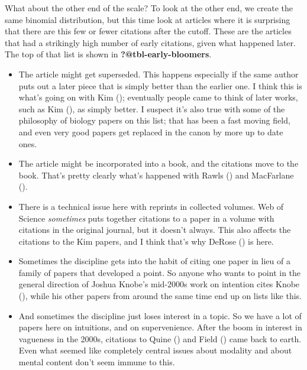 \documentclass[
  10pt,
  letterpaper,
  DIV=11,
  numbers=noendperiod,
  twoside]{scrartcl}
\providecommand{\tightlist}{%
  \setlength{\itemsep}{0pt}\setlength{\parskip}{0pt}}\usepackage{longtable,booktabs,array}
\begin{document}
What about the other end of the scale? To look at the other end, we
create the same binomial distribution, but this time look at articles
where it is surprising that there are this few or fewer citations after
the cutoff. These are the articles that had a strikingly high number of
early citations, given what happened later. The top of that list is
shown in \textbf{?@tbl-early-bloomers}.

\begin{itemize}
\tightlist
\item
  The article might get superseded. This happens especially if the same
  author puts out a later piece that is simply better than the earlier
  one. I think this is what's going on with Kim
  (); eventually people came to
  think of later works, such as Kim
  (), as simply better. I suspect
  it's also true with some of the philosophy of biology papers on this
  list; that has been a fast moving field, and even very good papers get
  replaced in the canon by more up to date ones.
\item
  The article might be incorporated into a book, and the citations move
  to the book. That's pretty clearly what's happened with Rawls
  () and MacFarlane
  ().
\item
  There is a technical issue here with reprints in collected volumes.
  Web of Science \emph{sometimes} puts together citations to a paper in
  a volume with citations in the original journal, but it doesn't
  always. This also affects the citations to the Kim papers, and I think
  that's why DeRose () is here.
\item
  Sometimes the discipline gets into the habit of citing one paper in
  lieu of a family of papers that developed a point. So anyone who wants
  to point in the general direction of Joshua Knobe's mid-2000s work on
  intention cites Knobe (), while
  his other papers from around the same time end up on lists like this.
\item
  And sometimes the discipline just loses interest in a topic. So we
  have a lot of papers here on intuitions, and on supervenience. After
  the boom in interest in vagueness in the 2000s, citations to Quine
  () and Field
  () came back to earth. Even what
  seemed like completely central issues about modality and about mental
  content don't seem immune to this.
\end{itemize}
\end{document}

